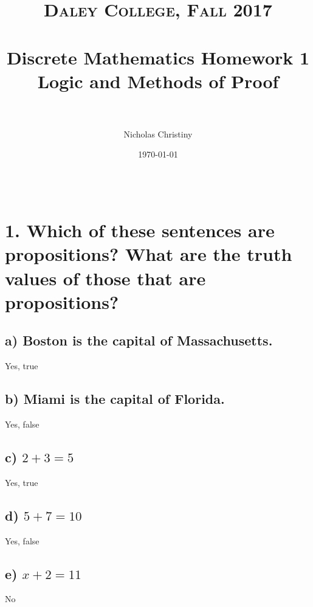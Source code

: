 \documentclass[11pt, oneside]{article} %
\title{	
\normalfont \normalsize 
\textsc{Daley College, Fall 2017} \\ [25pt] %
\horrule{0.5pt} \\[0.4cm] %
\huge Discrete Mathematics Homework 1 \\
\huge Logic and Methods of Proof \\ %
\horrule{2pt} \\[0.5cm] %
}
\author{Nicholas Christiny} %
\date{\normalsize\today} %
\numberwithin{equation}{section} %
\numberwithin{figure}{section} %
\numberwithin{table}{section} %
\begin{document}
\maketitle %

\section{ \\ 1. Which of these sentences are propositions? What are the truth values of those that are propositions?}




\subsection{a) Boston is the capital of Massachusetts.}
Yes, true
\subsection{b) Miami is the capital of Florida.}
Yes, false
\subsection{c) $2 + 3 = 5$}
Yes, true
\subsection{d) $5 + 7 = 10$}
Yes, false
\subsection{e) $x + 2 = 11$}
No
\end{document}
